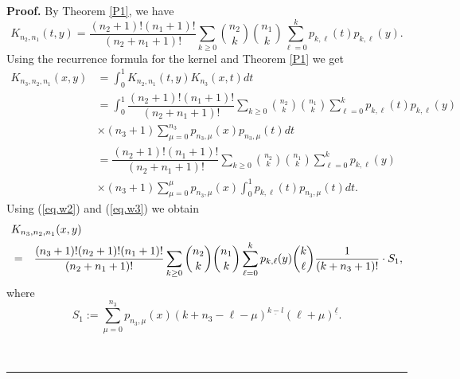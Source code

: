 \documentclass[10pt,a4paper]{amsart}
\newenvironment{proof}[1][Proof]{\noindent\textbf{#1.} }{\ \rule{0.5em}{0.5em}}
\begin{document}
\begin{proof}
By Theorem \ref{P1}, we have 
\begin{equation*}
K_{n_{2},n_{1}}(t,y)=\dfrac{(n_{2}+1)!(n_{1}+1)!}{(n_{2}+n_{1}+1)!}%
\displaystyle \sum_{k\geq 0}{\binom{n_{2}}{k}}{\binom{n_{1}}{k}}\sum_{\ell
=0}^{k}p_{k,\ell }(t)p_{k,\ell }(y).
\end{equation*}%
Using the recurrence formula for the kernel and Theorem \ref{P1} we get 
\begin{align*}
K_{n_{3},n_{2},n_{1}}(x,y)& =\displaystyle%
\int_{0}^{1}K_{n_{2},n_{1}}(t,y)K_{n_{3}}(x,t)dt \\
& =\displaystyle \int_{0}^{1}\dfrac{(n_{2}+1)!(n_{1}+1)!}{(n_{2}+n_{1}+1)!}%
\sum_{k\geq 0}{\binom{n_{2}}{k}}{\binom{n_{1}}{k}}\sum_{\ell
=0}^{k}p_{k,\ell }(t)p_{k,\ell }(y) \\
& \times (n_{3}+1)\sum_{\mu =0}^{n_{3}}p_{n_{3},\mu }(x)p_{n_{3},\mu }(t)dt
\\
& =\dfrac{(n_{2}+1)!(n_{1}+1)!}{(n_{2}+n_{1}+1)!}\sum_{k\geq 0}{\binom{n_{2}%
}{k}}{\binom{n_{1}}{k}}\sum_{\ell =0}^{k}p_{k,\ell }(y) \\
& \times (n_{3}+1)\sum_{\mu =0}^{\mu }p_{n_{3},\mu }(x)\int_{0}^{1}p_{k,\ell
}(t)p_{n_{3},\mu }(t)dt.
\end{align*}%
Using (\ref{eq.w2}) and (\ref{eq.w3}) we obtain 
\begin{eqnarray*}
\lefteqn{K_{n_{3},n_{2},n_{1}}(x,y)} \\
&=&\dfrac{(n_{3}+1)!(n_{2}+1)!(n_{1}+1)!}{(n_{2}+n_{1}+1)!}\sum_{k\geq 0}{%
\binom{n_{2}}{k}}{\binom{n_{1}}{k}}\sum_{\ell =0}^{k}p_{k,\ell }(y){\binom{k%
}{\ell }}\dfrac{1}{(k+n_{3}+1)!}\cdot S_{1},
\end{eqnarray*}%
where 
\begin{equation*}
S_{1}:=\displaystyle \sum_{\mu =0}^{n_{3}}p_{n_{3},\mu }(x)(k+n_{3}-\ell
-\mu )^{\underline{k-l}}(\ell +\mu )^{\underline{\ell }}.
\end{equation*}


\end{proof}
\end{document}

